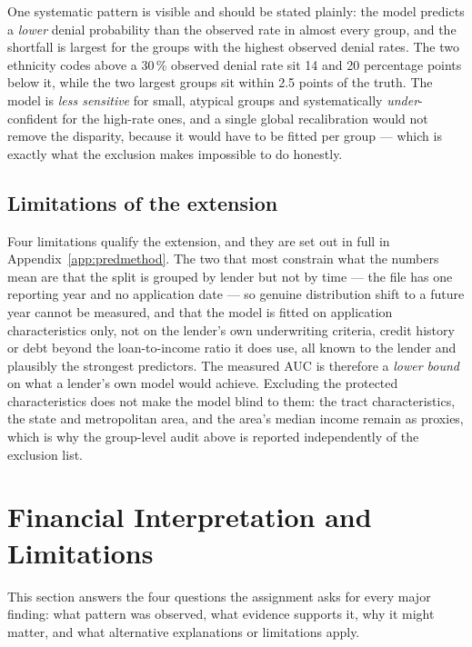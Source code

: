\documentclass[sigconf,balance=false]{acmart}
\begin{document}
One systematic pattern is visible and should be stated plainly: the model
predicts a \emph{lower} denial probability than the observed rate in almost
every group, and the shortfall is largest for the groups with the highest
observed denial rates. The two ethnicity codes above a 30\,\% observed
denial rate sit 14 and 20 percentage points below it, while the two largest
groups sit within 2.5 points of the truth. The model is \emph{less
sensitive} for small, atypical groups and systematically
\emph{under}-confident for the high-rate ones, and a single global
recalibration would not remove the disparity, because it would have to be
fitted per group --- which is exactly what the exclusion makes impossible
to do honestly.

\subsection{Limitations of the extension}

Four limitations qualify the extension, and they are set out in full in
Appendix~\ref{app:predmethod}. The two that most constrain what the numbers
mean are that the split is grouped by lender but not by time --- the file has
one reporting year and no application date --- so genuine distribution shift
to a future year cannot be measured, and that the model is fitted on
application characteristics only, not on the lender's own underwriting
criteria, credit history or debt beyond the loan-to-income ratio it does
use, all known to the lender and plausibly the strongest predictors. The
measured AUC is therefore a \emph{lower bound} on what a lender's own model
would achieve. Excluding the protected characteristics does not make the
model blind to them: the tract characteristics, the state and metropolitan
area, and the area's median income remain as proxies, which is why the
group-level audit above is reported independently of the exclusion list.

\section{Financial Interpretation and Limitations}\label{sec:interpretation}

This section answers the four questions the assignment asks for every major
finding: what pattern was observed, what evidence supports it, why it might
matter, and what alternative explanations or limitations apply.
\end{document}
